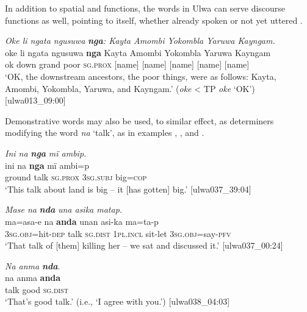   In addition to spatial and   functions, the  words in Ulwa can serve discourse functions as well, pointing to  itself, whether already spoken or not yet uttered .

\newpage

\ea%
    \label{ex:det:107}
          \textit{Oke li ngata ngusuwa} \textbf{\textit{nga}}\textit{: Kayta Amombi Yokombla Yaruwa Kayngam.}\\
\gll    oke  li    ngata  ngusuwa  \textbf{nga}    Kayta     Amombi Yokombla  Yaruwa  Kayngam\\
    ok  down  grand  poor    \textsc{sg.prox}  [name]   [name]    [name]    [name]    [name]\\
\glt `OK, the downstream ancestors, the poor things, were as follows: Kayta, Amombi, Yokombla, Yaruwa, and Kayngam.’ (\textit{oke} < TP \textit{oke} ‘OK’) [ulwa013\_09:00]
\z

Demonstrative words may also be used, to similar effect, as determiners modifying the word \textit{na} ‘talk’, as in examples , , and .

\ea%
    \label{ex:det:108}
          \textit{Ini na} \textbf{\textit{nga}} \textit{mï ambip.}\\
\gll    ini    na    \textbf{nga}    mï      ambi=p\\
    ground  talk  \textsc{sg.prox}  3\textsc{sg.subj}  big=\textsc{cop}\\
\glt `This talk about land is big -- it [has gotten] big.’ [ulwa037\_39:04]
\z

\ea%
    \label{ex:det:109}
          \textit{Mase na} \textbf{\textit{nda}} \textit{una asika matap.}\\
\gll    ma=asa-e      na    \textbf{anda}    unan    asi-ka ma=ta-p\\
    3\textsc{sg.obj}=hit\textsc{{}-dep} talk  \textsc{sg.dist}  \textsc{1pl.incl}  sit-let   3\textsc{sg.obj}=say-\textsc{pfv}\\
\glt `That talk of [them] killing her – we sat and discussed it.’ [ulwa037\_00:24]
\z

\ea%
    \label{ex:det:110}
          \textit{Na anma} \textbf{\textit{nda}}.\\
\gll na    anma  \textbf{anda}\\
    talk  good  \textsc{sg.dist}\\
\glt `That’s good talk.’ (i.e., ‘I agree with you.’) [ulwa038\_04:03]
\z

